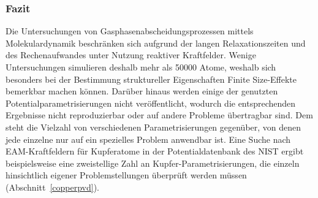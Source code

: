\subsubsection{Fazit}
Die Untersuchungen von Gasphasenabscheidungsprozessen mittels Molekulardynamik beschränken sich aufgrund der langen Relaxationszeiten und des Rechenaufwandes unter Nutzung reaktiver Kraftfelder.
Wenige Untersuchungen simulieren deshalb mehr als \num{50000} Atome, weshalb sich besonders bei der Bestimmung struktureller Eigenschaften Finite Size-Effekte bemerkbar machen können.
Darüber hinaus werden einige der genutzten Potentialparametrisierungen nicht veröffentlicht, wodurch die entsprechenden Ergebnisse nicht reproduzierbar oder auf andere Probleme übertragbar sind.
Dem steht die Vielzahl von verschiedenen Parametrisierungen gegenüber, von denen jede einzelne nur auf ein spezielles Problem anwendbar ist.
Eine Suche nach EAM-Kraftfeldern für Kupferatome in der Potentialdatenbank des NIST\cite{becker_interatomic_2014} ergibt beispielsweise eine zweistellige Zahl an Kupfer-Parametrisierungen, die einzeln hinsichtlich eigener Problemstellungen überprüft werden müssen (Abschnitt~\ref{copperpvd}).
